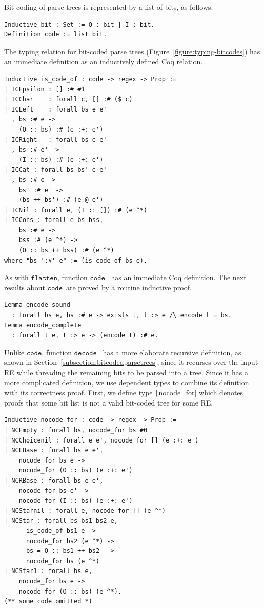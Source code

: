 \documentclass[review]{elsarticle}
\newcommand{\flatten}{\ensuremath{\texttt{flatten}}}
\newcommand{\code}{\ensuremath{\texttt{code}}}
\newcommand{\decodee}{\ensuremath{\texttt{decode}}}
\newcommand{\coq}[1]{\texttt|#1|}
\theoremstyle{definition}
\begin{document}
Bit coding of parse trees is represented by a list of bits, as follows:
\begin{verbatim}
Inductive bit : Set := O : bit | I : bit.
Definition code := list bit.
\end{verbatim}
The typing relation for bit-coded parse trees
(Figure~\ref{figure:typing-bitcodes}) has an immediate definition as an
inductively defined Coq relation.
\begin{verbatim}
Inductive is_code_of : code -> regex -> Prop :=
| ICEpsilon : [] :# #1
| ICChar    : forall c, [] :# ($ c)
| ICLeft    : forall bs e e'
  , bs :# e ->
    (O :: bs) :# (e :+: e')
| ICRight   : forall bs e e'
  , bs :# e' ->
    (I :: bs) :# (e :+: e')
| ICCat : forall bs bs' e e'
  , bs :# e ->
    bs' :# e' ->
    (bs ++ bs') :# (e @ e')
| ICNil : forall e, (I :: []) :# (e ^*)
| ICCons : forall e bs bss, 
    bs :# e -> 
    bss :# (e ^*) -> 
    (O :: bs ++ bss) :# (e ^*) 
where "bs ':#' e" := (is_code_of bs e).
\end{verbatim}
As with \flatten, function \code~ has an immediate Coq definition. The next
results about \code~are proved by a routine inductive proof.
\begin{verbatim}
Lemma encode_sound
  : forall bs e, bs :# e -> exists t, t :> e /\ encode t = bs.
Lemma encode_complete
  : forall t e, t :> e -> (encode t) :# e.   
\end{verbatim}
Unlike \code, function \decodee~ has a more elaborate recursive definition, as
shown in Section~\ref{subsection:bitcodedparsetrees}, since it recurses over the
input RE while threading the remaining bits to be parsed into a tree. Since it
has a more complicated definition, we use dependent types to combine its definition
with its correctness proof. First, we define type \coq{nocode_for} which
denotes proofs that some bit list is not a valid bit-coded tree for some RE.
\begin{verbatim}
Inductive nocode_for : code -> regex -> Prop :=
| NCEmpty : forall bs, nocode_for bs #0
| NCChoicenil : forall e e', nocode_for [] (e :+: e')
| NCLBase : forall bs e e', 
    nocode_for bs e -> 
    nocode_for (O :: bs) (e :+: e')
| NCRBase : forall bs e e', 
    nocode_for bs e' -> 
    nocode_for (I :: bs) (e :+: e')
| NCStarnil : forall e, nocode_for [] (e ^*)
| NCStar : forall bs bs1 bs2 e,
      is_code_of bs1 e ->
      nocode_for bs2 (e ^*) ->
      bs = O :: bs1 ++ bs2  ->
      nocode_for bs (e ^*)
| NCStar1 : forall bs e,
    nocode_for bs e ->
    nocode_for (O :: bs) (e ^*).
(** some code omitted *)
\end{verbatim}
\end{document}
